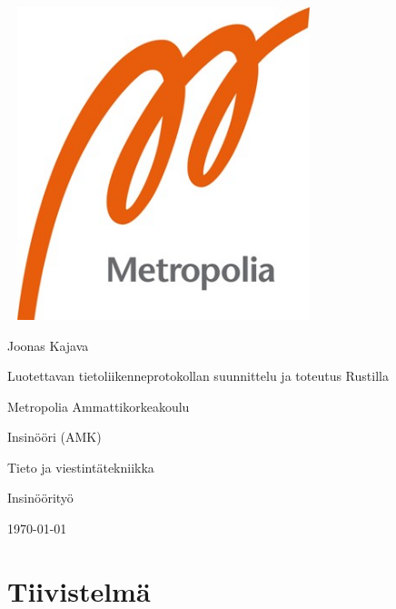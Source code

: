 \documentclass[a4paper,12pt]{article}
\author{Joonas Kajava}
\date{\today}
\renewcommand{\title}{Luotettavan tietoliikenneprotokollan \newline suunnittelu ja toteutus Rustilla}
\newcommand{\me}{Joonas Kajava}
\begin{document}
    \begin{titlepage}
    
        \pagestyle{empty}
        
        \includegraphics[width=9.1cm,height=9.1cm]{images/metropolia}\par\vspace{2cm}
        {\Large \me}\par \vspace{1cm}

        {\Huge \textcolor{title}{\title}}\par \vspace{1cm}

        \vfill

        Metropolia Ammattikorkeakoulu\par
        Insinööri (AMK)\par
        Tieto ja viestintätekniikka\par
        Insinöörityö\par
        \today

        \newpage



        \section*{Tiivistelmä}


\end{titlepage}
\end{document}
